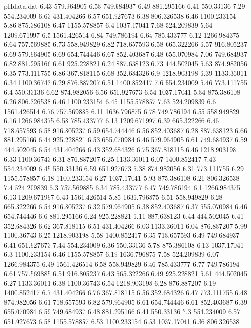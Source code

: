 \begin{filecontents}{pHdata.dat}
6.43	579.964905
6.58	749.684937
6.49	881.295166
6.41	550.33136
7.29	554.234009
6.63	431.404266
6.57	651.927673
6.38	806.326538
6.46	1100.233154
5.86	875.386108
6.47	1155.578857
6.4	1037.17041
7.68	524.209839
5.64	1209.671997
6.5	1561.426514
6.84	749.786194
6.64	785.433777
6.12	1266.984375
6.64	757.569885
6.73	558.949829
6.82	718.657593
6.58	665.322266
6.57	916.805237
6.69	579.964905
6.69	654.744446
6.67	852.403687
6.48	655.070984
7.06	749.684937
6.82	881.295166
6.61	925.228821
6.24	887.638123
6.73	444.502045
6.63	874.982056
6.35	773.111755
6.86	367.818115
6.68	352.684326
6.9	1218.903198
6.39	1133.36011
6.34	1100.36743
6.29	876.887207
6.51	1400.852417
7.6	554.234009
6.46	773.111755
6.4	550.33136
6.62	874.982056
6.56	651.927673
6.54	1037.17041
5.84	875.386108
6.26	806.326538
6.46	1100.233154
6.45	1155.578857
7.63	524.209839
6.6	1561.426514
6.76	757.569885
6.11	1636.796875
6.78	749.786194
6.55	558.949829
6.16	1266.984375
6.58	785.433777
6.13	1209.671997
6.39	665.322266
6.45	718.657593
6.58	916.805237
6.59	654.744446
6.56	852.403687
6.28	887.638123
6.66	881.295166
6.44	925.228821
6.53	655.070984
6.46	579.964905
6.61	749.684937
6.59	444.502045
6.54	431.404266
6.43	352.684326
6.75	367.818115
6.46	1218.903198
6.33	1100.36743
6.31	876.887207
6.25	1133.36011
6.07	1400.852417
7.43	554.234009
6.45	550.33136
6.59	651.927673
6.38	874.982056
6.31	773.111755
6.29	1155.578857
6.18	1100.233154
6.27	1037.17041
5.93	875.386108
6.21	806.326538
7.4	524.209839
6.3	757.569885
6.34	785.433777
6.47	749.786194
6.1	1266.984375
6.13	1209.671997
6.43	1561.426514
5.85	1636.796875
6.51	558.949829
6.28	665.322266
6.54	916.805237
6.32	579.964905
6.38	852.403687
6.37	655.070984
6.46	654.744446
6.6	881.295166
6.24	925.228821
6.11	887.638123
6.44	444.502045
6.41	352.684326
6.62	367.818115
6.51	431.404266
6.03	1133.36011
6.04	876.887207
5.99	1100.36743
6.25	1218.903198
5.58	1400.852417
6.35	718.657593
6.49	749.684937
6.41	651.927673
7.44	554.234009
6.36	550.33136
5.78	875.386108
6.13	1037.17041
6.3	1100.233154
6.46	1155.578857
6.19	1636.796875
7.58	524.209839
6.07	1266.984375
6.49	1561.426514
6.58	558.949829
6.46	785.433777
6.77	749.786194
6.61	757.569885
6.51	916.805237
6.43	665.322266
6.49	925.228821
6.61	444.502045
6.27	1133.36011
6.38	1100.36743
6.54	1218.903198
6.28	876.887207
6.19	1400.852417
6.7	431.404266
6.76	367.818115
6.56	352.684326
6.47	773.111755
6.48	874.982056
6.61	718.657593
6.82	579.964905
6.61	654.744446
6.61	852.403687
6.39	655.070984
6.59	749.684937
6.48	881.295166
6.41	550.33136
7.3	554.234009
6.57	651.927673
6.58	1155.578857
6.53	1100.233154
6.53	1037.17041
6.36	806.326538

\end{filecontents}
